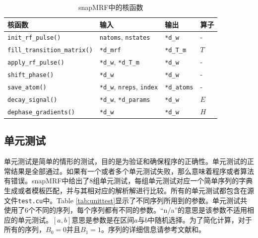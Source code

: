 \begin{table}
\centering
\caption{snapMRF中的核函数}
\begin{center}
\begin{tabular}{|l|l|l|l|}
\hline
\hline
核函数 & 输入 & 输出 & 算子\\
\hline
\texttt{init\_rf\_pulse()} & \texttt{natoms}, \texttt{nstates} & \texttt{*d\_w} & - \\
\hline
\texttt{fill\_transition\_matrix()} & \texttt{*d\_mrf} & \texttt{*d\_T\_m} & $T$ \\
\hline
\texttt{apply\_rf\_pulse()} & \texttt{*d\_w}, \texttt{*d\_T\_m} & \texttt{*d\_w} & - \\
\hline
\texttt{shift\_phase()} & \texttt{*d\_w} & \texttt{*d\_w} & - \\
\hline
\texttt{save\_atom()} & \texttt{*d\_w}, \texttt{nreps}, \texttt{index} & \texttt{*d\_atoms} & - \\
\hline
\texttt{decay\_signal()} & \texttt{*d\_w}, \texttt{*d\_params} & \texttt{*d\_w}  & $E$ \\
\hline
\texttt{dephase\_gradients()} & \texttt{*d\_w} & \texttt{*d\_w} & $H$ \\
\hline
\end{tabular}
\end{center}
\label{tab:kernel}
\end{table}

\subsection{单元测试}
单元测试是简单的情形的测试，目的是为验证和确保程序的正确性。单元测试的正常结果是全部通过。如果有一个或者多个单元测试失败，那么意味着程序或者算法有错误。snapMRF中给出了8组单元测试，每组单元测试对应一个简单序列的字典生成或者模板匹配，并与其相对应的解析解进行比较。所有的单元测试都包含在源文件\texttt{test.cu}中。Table \ref{tab:unittest}显示了不同序列所用到的参数。单元测试共使用了6个不同的序列，每个序列都有不同的参数。``n/a''的意思是该参数不适用相应的单元测试。$[a,b]$意思是参数是在区间$a$与$b$中随机选择。为了简化计算，对于所有的序列，$B_0=0$并且$B_1=1$。序列的详细信息请参考文献\cite{weigel}和\cite{web}。


